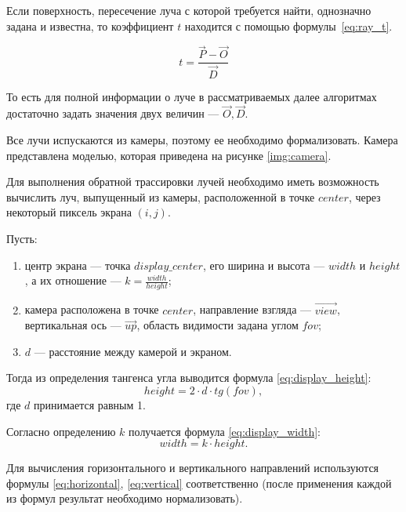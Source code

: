 
Если поверхность, пересечение луча с которой требуется найти, однозначно задана и известна, то коэффициент $t$ находится с помощью формулы~\ref{eq:ray_t}.

\begin{equation}\label{eq:ray_t}
	t = \frac{\overrightarrow{P} - \overrightarrow{O}}{\overrightarrow{D}}
\end{equation}

То есть для полной информации о луче в рассматриваемых далее алгоритмах достаточно задать значения двух величин --- $\overrightarrow{O}, \overrightarrow{D}$.

Все лучи испускаются из камеры, поэтому ее необходимо формализовать.
Камера представлена моделью, которая приведена на рисунке \ref{img:camera}.


Для выполнения обратной трассировки лучей необходимо иметь возможность вычислить луч, выпущенный из камеры, расположенной в точке $center$, через некоторый пиксель экрана $(i, j)$.

Пусть:
\begin{enumerate}
	\item центр экрана --- точка $display\_center$, его ширина и высота --- $width$ и $height$, а их отношение --- $k = \frac{width}{height}$;
	\item камера расположена в точке $center$, направление взгляда --- $\overrightarrow{view}$, вертикальная ось --- $\overrightarrow{up}$, область видимости задана углом $fov$;
	\item $d$ --- расстояние между камерой и экраном.
\end{enumerate}

Тогда из определения тангенса угла выводится формула \ref{eq:display_height}:
\begin{equation}\label{eq:display_height}
	height = 2 \cdot d \cdot tg(fov),
\end{equation}
где $d$ принимается равным 1.

Согласно определению $k$ получается формула \ref{eq:display_width}:
\begin{equation}\label{eq:display_width}
	width = k \cdot height.
\end{equation}

Для вычисления горизонтального и вертикального направлений используются формулы \ref{eq:horizontal}, \ref{eq:vertical} соответственно (после применения каждой из формул результат необходимо нормализовать).

